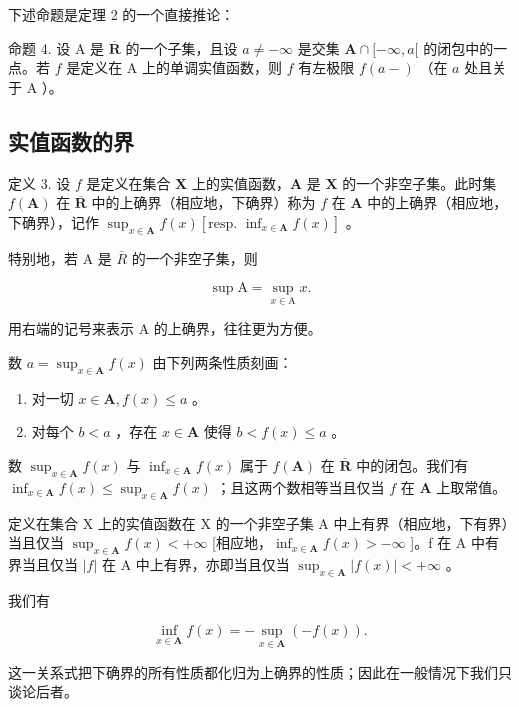 下述命题是定理 2 的一个直接推论：

命题 4. 设 A 是 \(\overline{\mathbf{R}}\) 的一个子集，且设 \(a \neq -\infty\) 是交集 \(\mathbf{A} \cap [-\infty, a[\) 的闭包中的一点。若 \(f\) 是定义在 A 上的单调实值函数，则 \(f\) 有左极限 \(f(a - )\) （在 \(a\) 处且关于 A ）。

\subsection{实值函数的界}

定义 3. 设 \(f\) 是定义在集合 \(\mathbf{X}\) 上的实值函数，\(\mathbf{A}\) 是 \(\mathbf{X}\) 的一个非空子集。此时集 \(f(\mathbf{A})\) 在 \(\overline{\mathbf{R}}\) 中的上确界（相应地，下确界）称为 \(f\) 在 \(\mathbf{A}\) 中的上确界（相应地，下确界），记作 \(\sup_{x\in \mathbf{A}}f(x)\left[\text{resp. } \inf_{x\in \mathbf{A}} f(x)\right]\) 。

特别地，若 A 是 \(\overline{R}\) 的一个非空子集，则

\[
\sup \mathrm{A} = \sup _ {x \in \mathrm{A}} x.\tag{1}
\]

用右端的记号来表示 A 的上确界，往往更为方便。

数 \(a = \sup_{x \in \mathbf{A}} f(x)\) 由下列两条性质刻画：

\begin{enumerate}
\def\labelenumi{(\roman{enumi})}
\item
  对一切 \(x \in \mathbf{A}, f(x) \leqslant a\) 。
\item
  对每个 \(b < a\) ，存在 \(x \in \mathbf{A}\) 使得 \(b < f(x) \leqslant a\) 。
\end{enumerate}

数 \(\sup_{x\in\mathbf{A}}f(x)\) 与 \(\inf_{x\in\mathbf{A}}f(x)\) 属于 \(f(\mathbf{A})\) 在 \(\overline{\mathbf{R}}\) 中的闭包。我们有 \(\inf_{x\in\mathbf{A}}f(x)\leqslant\sup_{x\in\mathbf{A}}f(x)\) ；且这两个数相等当且仅当 \(f\) 在 \(\mathbf{A}\) 上取常值。

定义在集合 X 上的实值函数在 X 的一个非空子集 A 中上有界（相应地，下有界）当且仅当 \(\sup_{x\in\mathbf{A}}f(x)<+\infty\) {[}相应地，\(\inf_{x\in\mathbf{A}}f(x)>-\infty\) {]}。f 在 A 中有界当且仅当 \(|f|\) 在 A 中上有界，亦即当且仅当 \(\sup_{x\in\mathbf{A}}|f(x)|<+\infty\) 。

我们有

\[
\inf _ {x \in \mathbf {A}} f (x) = - \sup _ {x \in \mathbf {A}} (- f (x)).\tag{2}
\]

这一关系式把下确界的所有性质都化归为上确界的性质；因此在一般情况下我们只谈论后者。

